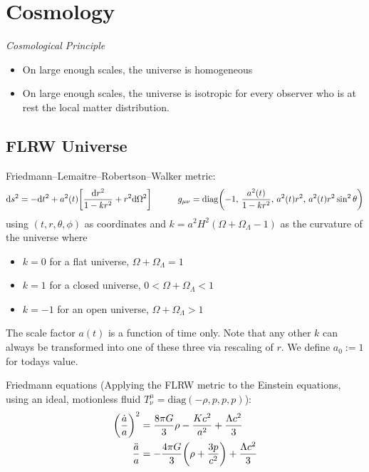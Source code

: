 \section{Cosmology}
	\emph{Cosmological Principle}
	\begin{itemize}
		\item On large enough scales, the universe is homogeneous
		\item On large enough scales, the universe is isotropic for every observer who is at rest \wrt the local matter distribution.
	\end{itemize}

	\subsection{FLRW Universe}
		Friedmann--Lemaitre--Robertson--Walker metric:
		\begin{equation}
			\dd s^2 = -\dd t^2 + a^2(t) \qty[\frac{\dd r^2}{1-kr^2} + r^2 \dd \Omega^2]
			\hspace{30pt}
			g_{\mu\nu} = \mathrm{diag}\qty(-1,\, \frac{a^2(t)}{1-kr^2},\, a^2(t) r^2,\, a^2(t) r^2 \sin^2 \theta)
		\end{equation}
		using $(t, r, \theta, \phi)$ as coordinates and $k = a^2 H^2 ( \Omega + \Omega_\Lambda - 1)$ as the curvature of the universe where
		\begin{itemize}
			\item $k=0$ for a flat universe, \ie $\Omega + \Omega_\Lambda = 1$
			\item $k=1$ for a closed universe, \ie $0 < \Omega + \Omega_\Lambda < 1$
			\item $k=-1$ for an open universe, \ie $\Omega + \Omega_\Lambda > 1$
		\end{itemize}
		The scale factor $a(t)$ is a function of time only. Note that any other $k$ can always be transformed into one of these three via rescaling of $r$. We define $a_0 := 1$ for todays value.

		\noindent
		Friedmann equations (Applying the FLRW metric to the Einstein equations, using an ideal, motionless fluid $T^\mu_\nu = \text{diag}(-\rho, p, p, p)$):
		\begin{equation}
			\begin{aligned}
				\qty(\frac{\dot{a}}{a})^2 &= \frac{8 \pi G}{3} \rho - \frac{K c^2}{a^2} + \frac{\Lambda c^2}{3} \\
				\frac{\ddot{a}}{a} &= -\frac{4 \pi G}{3} \qty(\rho + \frac{3p}{c^2}) + \frac{\Lambda c^2}{3} \\
			\end{aligned}
		\end{equation}

